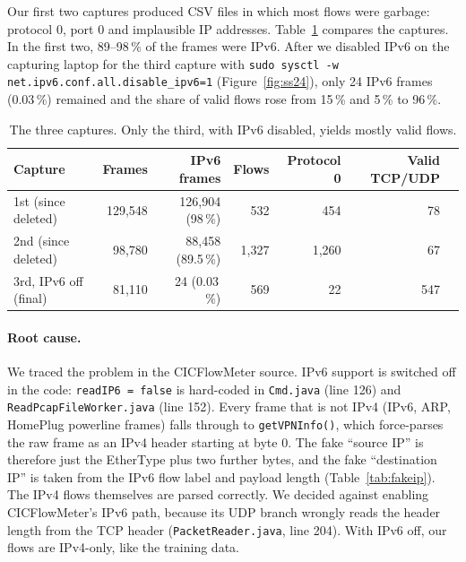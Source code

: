 Our first two captures produced CSV files in which most flows were garbage: protocol 0, port 0 and implausible IP addresses. Table~\ref{tab:captures} compares the captures. In the first two, 89--98\,\% of the frames were IPv6. After we disabled IPv6 on the capturing laptop for the third capture with \texttt{sudo sysctl -w net.ipv6.conf.all.disable\_ipv6=1} (Figure~\ref{fig:ss24}), only 24 IPv6 frames (0.03\,\%) remained and the share of valid flows rose from 15\,\% and 5\,\% to 96\,\%.


\begin{table}[ht]
	\centering\small
	\begin{tabular}{lrrrrrr}
		\toprule
		Capture & Frames & IPv6 frames & Flows & Protocol 0 & Valid TCP/UDP \\
		\midrule
		1st (since deleted) & 129,548 & 126,904 (98\,\%) & 532 & 454 & 78 \\
		2nd (since deleted) & 98,780 & 88,458 (89.5\,\%) & 1,327 & 1,260 & 67 \\
		3rd, IPv6 off (final) & 81,110 & 24 (0.03\,\%) & 569 & 22 & 547 \\
		\bottomrule
	\end{tabular}
	\caption{The three captures. Only the third, with IPv6 disabled, yields mostly valid flows.}
	\label{tab:captures}
\end{table}

\paragraph{Root cause.} We traced the problem in the CICFlowMeter source. IPv6 support is switched off in the code: \texttt{readIP6 = false} is hard-coded in \texttt{Cmd.java} (line 126) and \texttt{ReadPcapFileWorker.java} (line 152). Every frame that is not IPv4 (IPv6, ARP, HomePlug powerline frames) falls through to \texttt{getVPNInfo()}, which force-parses the raw frame as an IPv4 header starting at byte 0. The fake ``source IP'' is therefore just the EtherType plus two further bytes, and the fake ``destination IP'' is taken from the IPv6 flow label and payload length (Table~\ref{tab:fakeip}). The IPv4 flows themselves are parsed correctly. We decided against enabling CICFlowMeter's IPv6 path, because its UDP branch wrongly reads the header length from the TCP header (\texttt{PacketReader.java}, line 204). With IPv6 off, our flows are IPv4-only, like the training data.

